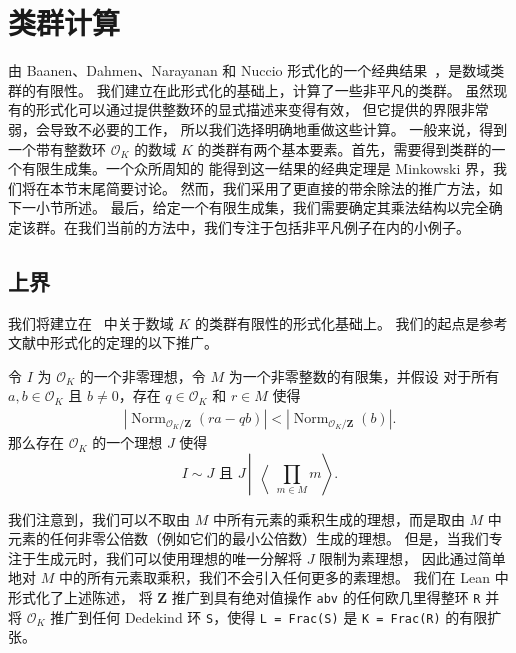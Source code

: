 \documentclass[sigplan,10pt,nonacm,
screen]{acmart} \settopmatter{printfolios=true,printccs=false,printacmref=false}
\newcommand{\ZZ}{\mathbf{Z}}
\newcommand{\OK}{\mathcal{O}_K}
\DeclareMathOperator{\Norm}{Norm}
\begin{document}
\section{类群计算}\label{sec:class_group}

由 Baanen、Dahmen、Narayanan 和 Nuccio 形式化的一个经典结果~\cite{baanen_formalization_2021}，是数域类群的有限性。
我们建立在此形式化的基础上，计算了一些非平凡的类群。
虽然现有的形式化可以通过提供整数环的显式描述来变得有效，
但它提供的界限非常弱，会导致不必要的工作，
所以我们选择明确地重做这些计算。
一般来说，得到一个带有整数环 $\mathcal{O}_K$ 的数域 $K$ 的类群有两个基本要素。首先，需要得到类群的一个有限生成集。一个众所周知的
能得到这一结果的经典定理是 Minkowski 界，我们将在本节末尾简要讨论。
然而，我们采用了更直接的带余除法的推广方法，如下一小节所述。
最后，给定一个有限生成集，我们需要确定其乘法结构以完全确定该群。在我们当前的方法中，我们专注于包括非平凡例子在内的小例子。

\subsection{上界} \label{sec:upper bound}

我们将建立在~\cite[第 8.2 节]{baanen_formalization_2021} 中关于数域 $K$ 的类群有限性的形式化基础上。
我们的起点是参考文献中形式化的定理的以下推广。

\begin{theorem}\label{thm main class group divisibility}
令 $I$ 为 $\OK$ 的一个非零理想，令 $M$ 为一个非零整数的有限集，并假设
对于所有 $a,b \in \mathcal{O}_K$ 且 $b\not= 0$，存在 $q \in \OK$ 和 $r \in M$ 使得
\begin{align}
  |\Norm_{\OK/\ZZ}(ra-qb)| < |\Norm_{\OK/\ZZ}(b)|. \label{eqn:div-with-remainder}
\end{align}
那么存在 $\OK$ 的一个理想 $J$ 使得
\[I \sim J \text{ 且 } J \,\left|\, \middle\langle \prod_{m \in M} m \right\rangle.\]
\end{theorem}

我们注意到，我们可以不取由 $M$ 中所有元素的乘积生成的理想，而是取由 $M$ 中元素的任何非零公倍数（例如它们的最小公倍数）生成的理想。
但是，当我们专注于生成元时，我们可以使用理想的唯一分解将 $J$ 限制为素理想，
因此通过简单地对 $M$ 中的所有元素取乘积，我们不会引入任何更多的素理想。
我们在 Lean 中形式化了上述陈述，
将 $\ZZ$ 推广到具有绝对值操作 \lstinline{abv} 的任何欧几里得整环 \lstinline{R}
并将 $\OK$ 推广到任何 Dedekind 环 \lstinline{S}，使得 \lstinline{L = Frac(S)} 是 \lstinline{K = Frac(R)} 的有限扩张。
\end{document}

